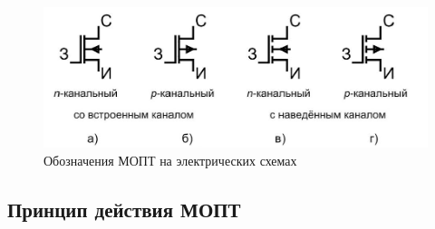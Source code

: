 \documentclass[a4paper,14pt]{article}
\begin{document}
\begin{figure}
	\centering
	\includegraphics[width=0.7\linewidth]{image/Teor_MOP_2}
	\caption{Обозначения МОПТ на электрических схемах}
	\label{fig:teormop2}
\end{figure}

\subsection{Принцип действия МОПТ}
\end{document}
